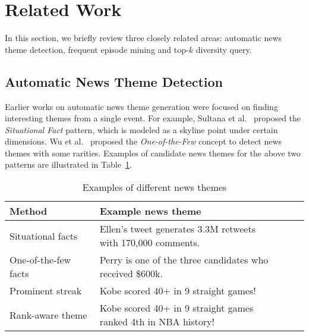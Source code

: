\section{Related Work}\label{sec:related_work}
In this section, we briefly review three closely related areas: automatic news theme detection, frequent episode mining and top-$k$ diversity query.

\subsection{Automatic News Theme Detection}
Earlier works on automatic news theme generation were focused on finding interesting themes from a single event. For example, Sultana et al.~\cite{sultana2014incremental} proposed the \emph{Situational Fact} pattern, which is modeled as a skyline point under certain dimensions. Wu et al.~\cite{wu2012one} proposed the \emph{One-of-the-Few} concept to detect news themes with some rarities. Examples of candidate news themes for the above two patterns are illustrated in Table~\ref{tbl:related_works}.

{\renewcommand{\arraystretch}{1.2} 
\begin{table}[h]
\centering
\begin{tabular}{|l|l|}
\hline
\textbf{Method} & \textbf{Example news theme}\\
\hline
Situational facts~\cite{sultana2014incremental} & \pbox{22cm}{\vspace{.3\baselineskip} Ellen's tweet generates 3.3M retweets\\ with 170,000 comments.\vspace{.3\baselineskip}} \\
\hline
One-of-the-few facts~\cite{wu2012one} & \pbox{22cm}{\vspace{.3\baselineskip}Perry is one of the three candidates \\  who received \$600k. \vspace{.3\baselineskip}} \\
\hline
Prominent streak~\cite{zhang2014discovering} & Kobe scored 40+ in 9 straight games!  \\
\hline
Rank-aware theme & \pbox{22cm}{\vspace{.3\baselineskip}Kobe scored 40+ in 9 straight games\\ ranked 4th in NBA history!\vspace{.3\baselineskip}} \\
\hline
\end{tabular}
\label{tbl:related_works}
\caption{Examples of different news themes}
\end{table}
}

